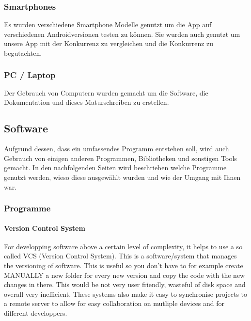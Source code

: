 \documentclass[a4paper,11pt]{article}
\begin{document}
\subsubsection{Smartphones}

Es wurden verschiedene Smartphone Modelle genutzt um die App auf verschiedenen Androidversionen testen zu können. Sie wurden auch genutzt um unsere App mit der Konkurrenz zu vergleichen und die 
Konkurrenz zu begutachten. 

\subsubsection{PC / Laptop}

Der Gebrauch von Computern wurden gemacht um die Software, die Dokumentation und dieses Maturschreiben zu erstellen. 
\subsection{Software}

Aufgrund dessen, dass ein umfassendes Programm entstehen soll, wird auch Gebrauch von einigen anderen Programmen, Bibliotheken und sonstigen Tools gemacht. In den nachfolgenden Seiten wird beschrieben welche Programme genutzt werden, wieso diese ausgewählt wurden und wie der Umgang mit Ihnen war.  


\subsubsection{Programme}

\paragraph{Version Control System}

For developping software above a certain level of complexity, it helps to use a so called VCS (Version Control System). This is a software/system that manages the versioning of software. This is useful so you don't have to for example create MANUALLY a new folder for every new version and copy the code with the new changes in there. This would be not very user friendly, wasteful of disk space and overall very inefficient. These systems also make it easy to synchronise projects to a remote server to allow for easy collaboration on mutliple devices and for different developpers.\\
\end{document}
